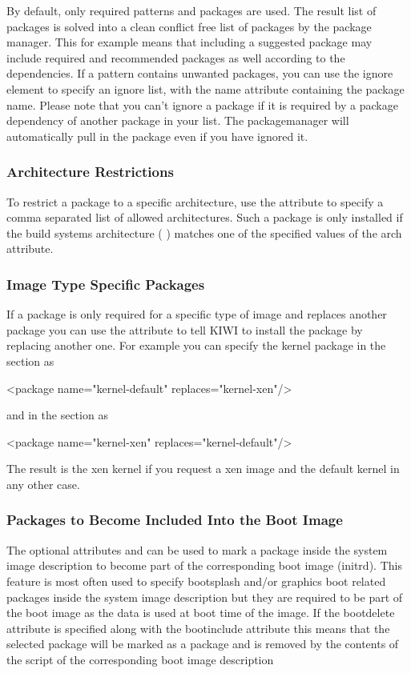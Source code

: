 By default, only required patterns and packages are used. The result
list of packages is solved into a clean conflict free list of packages
by the package manager. This for example means that including a suggested
package may include required and recommended packages as well according
to the dependencies. If a pattern contains unwanted packages, you can use
the ignore element to specify an ignore list, with the name attribute
containing the package name. Please note that you can't ignore a package
if it is required by a package dependency of another package in your list.
The packagemanager will automatically pull in the package even if you have
ignored it.

\subsubsection{Architecture Restrictions}
To restrict a package to a specific architecture, use
the  attribute to specify a comma separated list of allowed
architectures. Such a package is only installed if the build systems
architecture ( ) matches one of the specified values of the arch
attribute.

\subsubsection{Image Type Specific Packages}
If a package is only required for a specific type of image
and replaces another package you can use the  attribute
to tell KIWI to install the package by replacing another one. For example
you can specify the kernel package in the  section as

\begin{xml}
<package name="kernel-default" replaces="kernel-xen"/>
\end{xml}

and in the  section as

\begin{xml}
<package name="kernel-xen" replaces="kernel-default"/>
\end{xml}

The result is the xen kernel if you request a xen image and the
default kernel in any other case.

\subsubsection{Packages to Become Included Into the Boot Image}
The optional attributes  and 
can be used to mark a package inside the system image description to
become part of the corresponding boot image (initrd). This feature
is most often used to specify bootsplash and/or graphics boot related
packages inside the system image description but they are required
to be part of the boot image as the data is used at boot time
of the image. If the bootdelete attribute is specified along with
the bootinclude attribute this means that the selected package
will be marked as a  package and is
removed by the contents of the 
 script of the corresponding
boot image description

